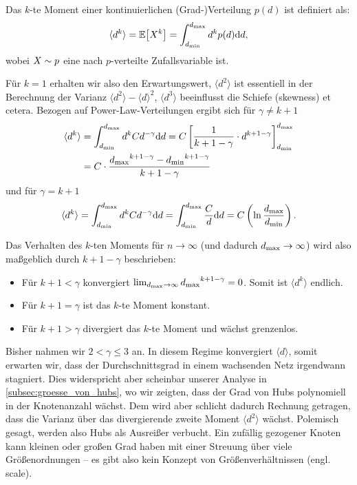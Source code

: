 Das $k$-te Moment einer kontinuierlichen (Grad-)Verteilung $p(d)$ ist definiert als:
\begin{equation}
    \langle d^k \rangle = \mathbb{E}\!\left[X^k\right] = \int_{{d_{\text{min}}}}^{{d_{\text{max}}}} d^k p(d) \text d d,
\end{equation}
wobei $X \sim p$ eine nach $p$-verteilte Zufallsvariable ist.

Für $k=1$ erhalten wir also den Erwartungswert, $\langle d^2 \rangle$ ist essentiell in der Berechnung der Varianz $\langle d^2 \rangle - \langle d \rangle^2$, $\langle d^3 \rangle$ beeinflusst die Schiefe (skewness) et cetera.
Bezogen auf Power-Law-Verteilungen ergibt sich für $\gamma \neq k + 1$
\begin{align}
    \langle d^k \rangle
    & = \int_{{d_{\text{min}}}}^{{d_{\text{max}}}} d^k C d^{-\gamma} \text d d
    = C \left[ \frac{1}{k + 1 - \gamma} \cdot d^{k + 1 -\gamma}\right]_{{d_{\text{min}}}}^{{d_{\text{max}}}}    \\
    & = C \cdot \frac{{d_{\text{max}}}^{k + 1 -\gamma} - {d_{\text{min}}}^{k + 1 -\gamma}}{k + 1 - \gamma}
\end{align}
und für $\gamma = k + 1$
\begin{equation}
	\langle d^k \rangle
	= \int_{{d_{\text{min}}}}^{{d_{\text{max}}}} d^k C d^{-\gamma} \text d d
	= \int_{{d_{\text{min}}}}^{{d_{\text{max}}}} \frac{C}{d} \text d d
	= C \left( \ln \frac{{d_{\text{max}}}}{{d_{\text{min}}}} \right).
\end{equation}

Das Verhalten des $k$-ten Moments für $n \to \infty$ (und dadurch ${d_{\text{max}}} \to \infty$) wird also maßgeblich durch $k + 1 - \gamma$ beschrieben:
\begin{itemize}
    \item Für $k + 1 < \gamma$ konvergiert $\lim_{{d_{\text{max}}} \to \infty} {d_{\text{max}}}^{k + 1 -\gamma} = 0$.
          Somit ist $\langle d^k \rangle$ endlich.

    \item Für $k + 1 = \gamma$ ist das $k$-te Moment konstant.

    \item Für $k + 1 > \gamma$ divergiert das $k$-te Moment und wächst grenzenlos.
\end{itemize}

\noindent
Bisher nahmen wir $2 < \gamma \le 3$ an.
In diesem Regime konvergiert $\langle d \rangle$, somit erwarten wir, dass der Durchschnittsgrad in einem wachsenden Netz irgendwann stagniert.
Dies widerspricht aber scheinbar unserer Analyse in \cref{subsec:groesse_von_hubs}, wo wir zeigten, dass der Grad von Hubs polynomiell in der Knotenanzahl wächst.
Dem wird aber schlicht dadurch Rechnung getragen, dass die Varianz über das divergierende zweite Moment $\langle d^2 \rangle$ wächst.
Polemisch gesagt, werden also Hubs als Ausreißer verbucht.
Ein zufällig gezogener Knoten kann kleinen oder großen Grad haben mit einer Streuung über viele Größenordnungen -- es gibt also kein Konzept von Größenverhältnissen (engl. scale).
